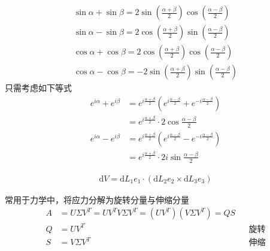 \begin{thm}
\begin{align*}
		\sin  \alpha+\sin \beta = 2\sin \left( \frac{\alpha+\beta}{2}  \right) \cos \left( \frac{\alpha-\beta}{2}  \right) \\
		\sin  \alpha-\sin \beta = 2\cos \left( \frac{\alpha+\beta}{2}  \right) \sin \left( \frac{\alpha-\beta}{2}  \right) \\
		\cos  \alpha+\cos \beta = 2\cos \left( \frac{\alpha+\beta}{2}  \right) \cos \left( \frac{\alpha-\beta}{2}  \right) \\
		\cos  \alpha-\cos \beta =- 2\sin \left( \frac{\alpha+\beta}{2}  \right) \sin \left( \frac{\alpha-\beta}{2}  \right) 
\end{align*}
只需考虑如下等式
\begin{align*}
		e^{i\alpha}+e^{i\beta}&=e^{i\frac{ \alpha+\beta }{2} }\left( e^{i\frac{\alpha-\beta}{2}} + e^{-i \frac{\alpha-\beta}{2} }\right) 	\\
							  &= e^{i\frac{\alpha+\beta}{2}} \cdot 2\cos \frac{\alpha-\beta}{2} \\
		e^{i\alpha}-e^{i\beta}&=e^{i\frac{ \alpha+\beta }{2} }\left( e^{i\frac{\alpha-\beta}{2}} - e^{-i \frac{\alpha-\beta}{2} }\right) 	\\
							  &= e^{i\frac{\alpha+\beta}{2}} \cdot 2i\sin \frac{\alpha-\beta}{2} 
\end{align*}
\end{thm}
\begin{thm}[给定三个向量形成三维图形的体积]
		\begin{align*}
				\mathrm{d}V = \mathrm{d}L_1e_1\cdot (\mathrm{d}L_2e_2\times \mathrm{d}L_3e_3)  
		\end{align*}
\end{thm}
\begin{thm}[极分解]
常用于力学中，将应力分解为旋转分量与伸缩分量
\begin{align*}
		A &= U \Sigma V^T = UV^TV\Sigma V^T = (UV^T)(V\Sigma V^T) = QS\\
		Q &= UV^T  &&\text{旋转} \\
		S &= V\Sigma V^T &&\text{伸缩} 
\end{align*}
\end{thm}

